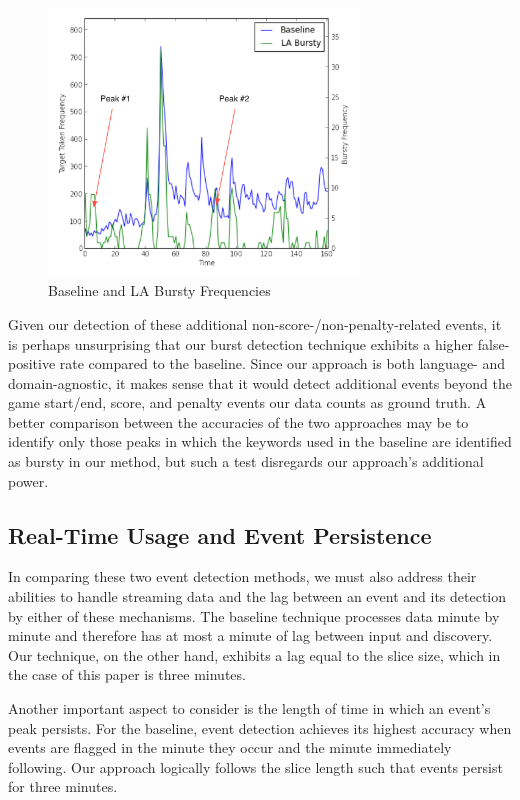 \documentclass{acm_proc_article-sp}
\begin{document}
\begin{figure}[hbtp]
\begin{center}
\includegraphics[width=3.25in]{./figures/wc0713freq-labeled.png}
\caption{Baseline and LA Bursty Frequencies}
\label{fig:worldCupFreqs}
\end{center}
\end{figure}

Given our detection of these additional non-score-/non-penalty-related events, it is perhaps unsurprising that our burst detection technique exhibits a higher false-positive rate compared to the baseline.
Since our approach is both language- and domain-agnostic, it makes sense that it would detect additional events beyond the game start/end, score, and penalty events our data counts as ground truth.
A better comparison between the accuracies of the two approaches may be to identify only those peaks in which the keywords used in the baseline are identified as bursty in our method, but such a test disregards our approach's additional power.

\subsection{Real-Time Usage and Event Persistence}

In comparing these two event detection methods, we must also address their abilities to handle streaming data and the lag between an event and its detection by either of these mechanisms.
The baseline technique processes data minute by minute and therefore has at most a minute of lag between input and discovery.
Our technique, on the other hand, exhibits a lag equal to the slice size, which in the case of this paper is three minutes.

Another important aspect to consider is the length of time in which an event's peak persists.
For the baseline, event detection achieves its highest accuracy when events are flagged in the minute they occur and the minute immediately following.
Our approach logically follows the slice length such that events persist for three minutes.
\end{document}
